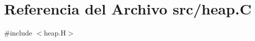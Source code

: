 \hypertarget{heap_8_c}{}\section{Referencia del Archivo src/heap.C}
\label{heap_8_c}
{\ttfamily \#include $<$heap.\+H$>$}\newline
